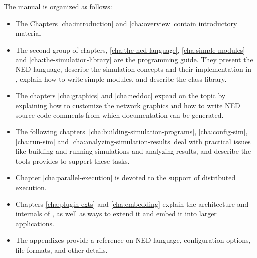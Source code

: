 The manual is organized as follows:

\begin{itemize}
  \item{The Chapters \ref{cha:introduction} and \ref{cha:overview}
    contain introductory material}
  \item{The second group of chapters,
    \ref{cha:the-ned-language},
    \ref{cha:simple-modules} and
    \ref{cha:the-simulation-library}
    are the programming guide. They present the NED language,
    describe the simulation concepts and their implementation in {\opp}, explain
    how to write simple modules, and describe the class library.}
  \item{The chapters \ref{cha:graphics} and \ref{cha:neddoc}
    expand on the topic by explaining how to customize
    the network graphics and how to write NED source code comments
    from which documentation can be generated.}
  \item{The following chapters, \ref{cha:building-simulation-programs},
    \ref{cha:config-sim}, \ref{cha:run-sim} and
    \ref{cha:analyzing-simulation-results} deal with practical issues
    like building and running simulations and analyzing results, and
    describe the tools {\opp} provides to support these tasks.}
  \item{Chapter \ref{cha:parallel-execution} is devoted to the support
    of distributed execution.}
  \item{Chapters \ref{cha:plugin-exts} and \ref{cha:embedding}
    explain the architecture and internals of {\opp}, as well as
    ways to extend it and embed it into larger applications.}
  \item{The appendixes provide a reference on NED language,
    configuration options, file formats, and other details.}
\end{itemize}




